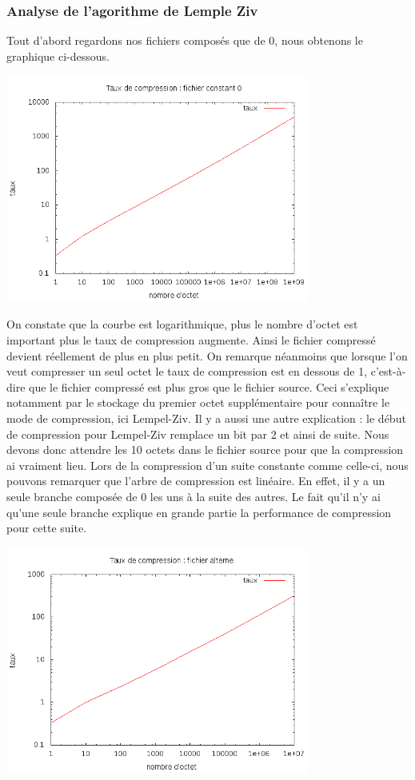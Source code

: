 \documentclass{report}
\begin{document}
\subsubsection{ Analyse de l'agorithme de Lemple Ziv}

Tout d'abord regardons nos fichiers composés que de 0, nous obtenons le graphique ci-dessous.
\begin{center}

\includegraphics[width=10cm]{LZConstant.png}

\end{center}

On constate que la courbe est logarithmique, plus le nombre d'octet est important plus le taux de compression augmente. Ainsi le fichier compressé devient réellement de plus en plus petit. 
On remarque néanmoins que lorsque l'on veut compresser un seul octet le taux de compression est en dessous de 1, c'est-à-dire que le fichier compressé est plus gros que le fichier source. Ceci s'explique notamment par le stockage du premier  octet supplémentaire pour connaître le mode de compression, ici Lempel-Ziv. Il y a aussi une autre explication :  le début de compression pour Lempel-Ziv remplace un bit par 2 et ainsi de suite. Nous devons donc attendre les 10 octets dans le fichier source pour que la compression ai vraiment lieu. 
Lors de la compression d'un suite constante comme celle-ci, nous pouvons remarquer que l'arbre de compression est linéaire. En effet, il y a un seule branche composée de 0 les uns à la suite des autres. Le fait qu'il n'y ai qu'une seule branche explique en grande partie la performance de compression pour cette suite. 

\begin{center}
\includegraphics[width=10cm]{LZAlterner.png}
\end{center}
\end{document}
